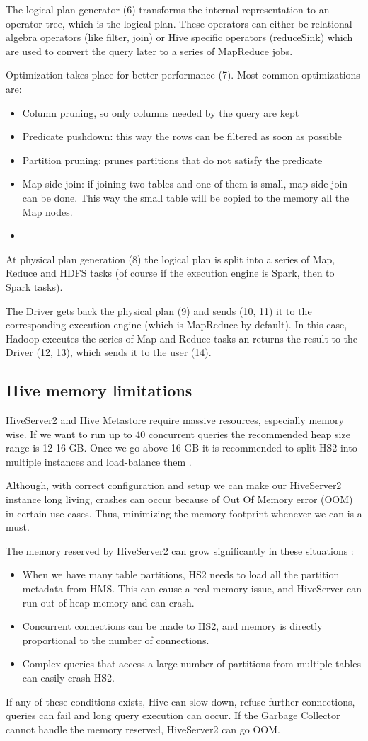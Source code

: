 The logical plan generator (6) transforms the internal representation to an operator tree, which is the logical plan. These operators can either be relational algebra operators (like filter, join) or Hive specific operators (\eg reduceSink) which are used to convert the query later to a series of MapReduce jobs.

Optimization takes place for better performance (7). Most common optimizations are: 
\begin{itemize}
	\item Column pruning, so only columns needed by the query are kept
	\item Predicate pushdown: this way the rows can be filtered as soon as possible
	\item Partition pruning: prunes partitions that do not satisfy the predicate
	\item Map-side join: if joining two tables and one of them is small, map-side join can be done. This way the small table will be copied to the memory all the Map nodes.
	\item \etc
\end{itemize}

At physical plan generation (8) the logical plan is split into a series of Map, Reduce and HDFS tasks (of course if the execution engine is Spark, then to Spark tasks). 

The Driver gets back the physical plan (9) and sends (10, 11) it to the corresponding execution engine (which is MapReduce by default). In this case, Hadoop executes the series of Map and Reduce tasks an returns the result to the Driver (12, 13), which sends it to the user (14).

\subsection{Hive memory limitations}
HiveServer2 and Hive Metastore require massive resources, especially memory wise. If we want to run up to 40 concurrent queries the recommended heap size range is 12-16 GB. Once we go above 16 GB it is recommended to split HS2 into multiple instances and load-balance them \cite{Hive-memory-problems}.

Although, with correct configuration and setup we can make our HiveServer2 instance long living, crashes can occur because of Out Of Memory error (OOM) in certain use-cases. Thus, minimizing the memory footprint whenever we can is a must.

\noindent The memory reserved by HiveServer2 can grow significantly in these situations  \cite{Hive-memory-problems}: 
\begin{itemize}
	\item When we have many table partitions, HS2 needs to load all the partition metadata from HMS. This can cause a real memory issue, and  HiveServer can run out of heap memory and can crash.
	\item Concurrent connections can be made to HS2, and memory is directly proportional to the number of connections. 
	\item Complex queries that access a large number of partitions from multiple tables can easily crash HS2.
\end{itemize}

If any of these conditions exists, Hive can slow down, refuse further connections, queries can fail and long query execution can occur. If the Garbage Collector cannot handle the memory reserved, HiveServer2 can go OOM.
